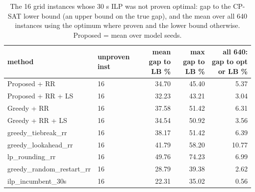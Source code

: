 \begin{table}[t]
\centering
\caption{The 16 grid instances whose 30 s ILP was not proven optimal: gap to the CP-SAT lower bound (an upper bound on the true gap), and the mean over all 640 instances using the optimum where proven and the lower bound otherwise. Proposed = mean over model seeds.}
\label{tab:unproven_lb}
\scriptsize
\begin{tabular}{llrrr}
\toprule
method & unproven inst & mean gap to LB \% & max gap to LB \% & all 640: gap to opt or LB \% \\
\midrule
Proposed + RR & 16 & 34.70 & 45.40 & 5.37 \\
Proposed + RR + LS & 16 & 32.23 & 43.21 & 3.04 \\
Greedy + RR & 16 & 37.58 & 51.42 & 6.31 \\
Greedy + RR + LS & 16 & 34.54 & 50.92 & 3.56 \\
greedy\_tiebreak\_rr & 16 & 38.17 & 51.42 & 6.39 \\
greedy\_lookahead\_rr & 16 & 41.79 & 58.20 & 10.77 \\
lp\_rounding\_rr & 16 & 49.76 & 74.23 & 6.99 \\
greedy\_random\_restart\_rr & 16 & 28.79 & 39.38 & 2.62 \\
ilp\_incumbent\_30s & 16 & 22.31 & 35.02 & 0.56 \\
\bottomrule
\end{tabular}
\end{table}
